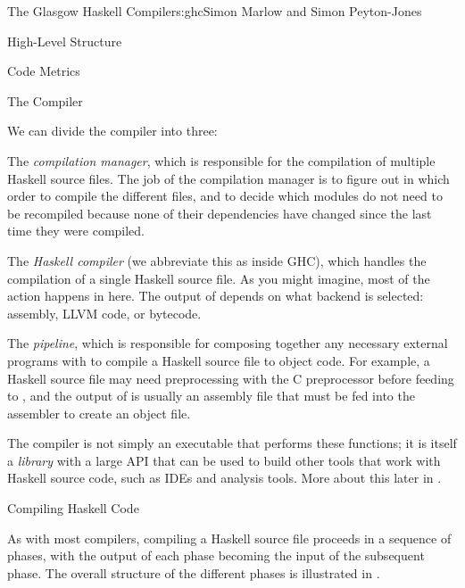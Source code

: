 \begin{aosachapter}{The Glasgow Haskell Compiler}{s:ghc}{Simon Marlow and Simon Peyton-Jones}
\begin{aosasect1}{High-Level Structure}
\begin{aosasect2}{Code Metrics}
\end{aosasect2}

\begin{aosasect2}{The Compiler}

We can divide the compiler into three:

\begin{aosaitemize}

\item The \emph{compilation manager}, which is responsible for the
  compilation of multiple Haskell source files.  The job of the
  compilation manager is to figure out in which order to compile the
  different files, and to decide which modules do not need to be
  recompiled because none of their dependencies have changed since the
  last time they were compiled.

\item The \emph{Haskell compiler} (we abbreviate this as 
  inside GHC), which handles the compilation of a single Haskell
  source file.  As you might imagine, most of the action happens in
  here.  The output of  depends on what backend is selected:
  assembly, LLVM code, or bytecode.

\item The \emph{pipeline}, which is responsible for composing together
  any necessary external programs with  to compile a Haskell
  source file to object code.  For example, a Haskell source file may
  need preprocessing with the C preprocessor before feeding to
  , and the output of  is usually an assembly file
  that must be fed into the assembler to create an object file.

\end{aosaitemize}

The compiler is not simply an executable that performs these
functions; it is itself a \emph{library} with a large API that can be
used to build other tools that work with Haskell source code, such as
IDEs and analysis tools.  More about this later in
.

\end{aosasect2}

\begin{aosasect2}{Compiling Haskell Code}

As with most compilers, compiling a Haskell source file proceeds in a
sequence of phases, with the output of each phase becoming the input
of the subsequent phase.  The overall structure of the different
phases is illustrated in .


\end{aosasect2}
\end{aosasect1}
\end{aosachapter}
